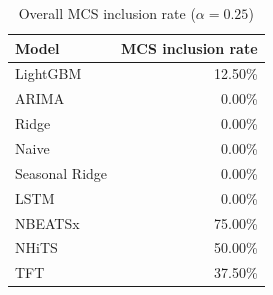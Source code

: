\begin{table}
\caption{Overall MCS inclusion rate ($\alpha=0.25$)}
\begin{tabular}{lr}
\toprule
Model & MCS inclusion rate \\
\midrule
LightGBM & 12.50\% \\
ARIMA & 0.00\% \\
Ridge & 0.00\% \\
Naive & 0.00\% \\
Seasonal Ridge & 0.00\% \\
LSTM & 0.00\% \\
NBEATSx & 75.00\% \\
NHiTS & 50.00\% \\
TFT & 37.50\% \\
\bottomrule
\end{tabular}
\end{table}
